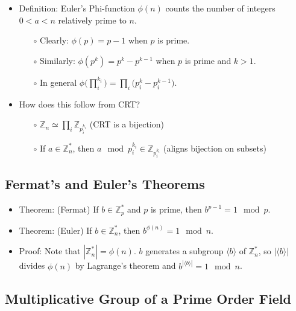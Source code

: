 \documentclass[a4paper]{scrartcl}
\begin{document}
\begin{itemize}
\item Definition: Euler's Phi-function $\phi(n)$ counts the number of integers $0<a<n$ relatively prime to $n$.
\begin{itemize}
\item [$\circ$] Clearly: $\phi(p) = p-1$ when $p$ is prime.
\item [$\circ$] Similarly: $\phi(p^k) = p^k - p^{k-1}$ when $p$ is prime and $k>1$.
\item [$\circ$] In general $\phi\Big(\prod_i^{k_i}\Big) = \prod_i\Big(p_i^k - p_i^{k-1}\Big)$.
\end{itemize}
\item How does this follow from CRT?
\begin{itemize}
\item [$\circ$] $\mathbb{Z}_n \simeq \prod_i \mathbb{Z}_{p_i^{k_i}}$ (CRT is a bijection)
\item [$\circ$] If $a \in \mathbb{Z}_n^*$, then $a \mod p_i^{k_i} \in \mathbb{Z}_{p_i^{k_i}}$ (aligns bijection on subsets)
\end{itemize}
\end{itemize}

\subsection*{Fermat's and Euler's Theorems}

\begin{itemize}
\item Theorem: (Fermat) If $b \in \mathbb{Z}_p^*$ and $p$ is prime, then $b^{p-1} = 1 \mod p$.
\item Theorem: (Euler) If $b \in \mathbb{Z}_n^*$, then $b^{\phi(n)} = 1 \mod n.$
\item Proof: Note that $|\mathbb{Z}_n^*| = \phi(n)$. $b$ generates a subgroup $\langle b\rangle$ of $\mathbb{Z}_n^*$, so $|\langle b\rangle|$ divides $\phi(n)$ by Lagrange's theorem and $b^{|\langle b\rangle|} = 1 \mod n$.
\end{itemize}

\subsection*{Multiplicative Group of a Prime Order Field}
\end{document}
